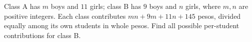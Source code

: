 Class A has $m$ boys and $11$ girls; class B has $9$ boys and $n$ girls, where $m,n$ are positive integers. Each class contributes $mn+9m+11n+145$ pesos, divided equally among its own students in whole pesos. Find all possible per-student contributions for class B.
